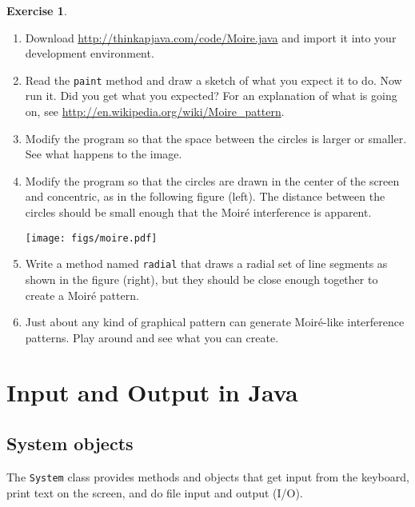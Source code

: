 \documentclass[12pt]{book}
\theoremstyle{definition}
\newtheorem{excz}{Exercise}[chapter]
\newenvironment{exercise}{\bigskip\begin{excz}\mbox{}}{\end{excz}}
\begin{document}
\begin{exercise}
\begin{enumerate}

\item Download
\url{http://thinkapjava.com/code/Moire.java} and import it into
your development environment.  

\item Read the {\tt paint} method and draw a sketch of
what you expect it to do.  Now run it.  Did you get what you
expected?  For an explanation of what is going on, see
\url{http://en.wikipedia.org/wiki/Moire_pattern}.

\item Modify the program so that the space between the circles is
larger or smaller.  See what happens to the image.

\item Modify the program so that the circles are drawn in the center
of the screen and concentric, as in the following figure (left).
The distance between the circles should be small enough
that the Moir\'{e} interference is apparent.

\texttt{[image: figs/moire.pdf]}

\item Write a method named {\tt radial} that draws a radial set
of line segments as shown in the figure (right), but they should be close
enough together to create a Moir\'{e} pattern.

\item Just about any kind of graphical pattern can generate
Moir\'{e}-like interference patterns.  Play around and see what you
can create.

\end{enumerate}
\end{exercise}


\chapter{Input and Output in Java}
\label{javaio}

\section{System objects}
\label{system}

The {\tt System} class provides
methods and objects that get input from the keyboard,
print text on the screen, and do file input and output (I/O).
\end{document}
